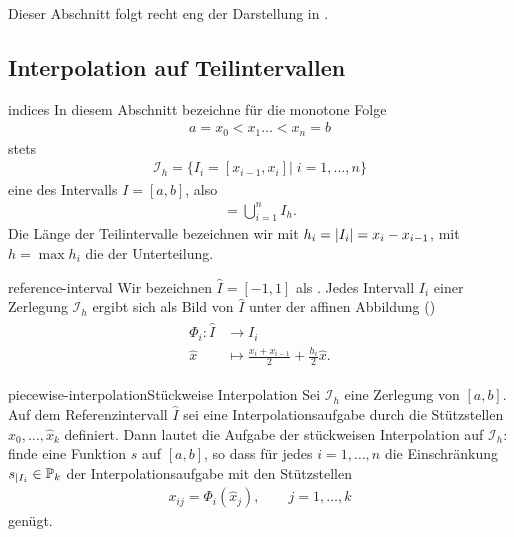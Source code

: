 Dieser Abschnitt folgt recht eng der Darstellung in \cite[Abschnitt 2.3]{Rannacher17}.

\subsection{Interpolation auf Teilintervallen}

\begin{Notation}{indices}
  In diesem Abschnitt bezeichne für die monotone Folge
  \begin{gather}
    a = x_0 < x_1 \dots < x_n = b
  \end{gather}
  stets
  \begin{gather}
    \mathcal I_h = \bigl\{ I_i = [x_{i-1},x_i] \big|
    \; i=1,\dots,n\bigr\}
  \end{gather}
  eine  des Intervalls $I=[a,b]$, also
  \begin{gather}
    [a,b] = \bigcup_{i=1}^n I_h.
  \end{gather}
  Die Länge der Teilintervalle bezeichnen wir mit
  $h_i = \abs{I_i} = x_{i} - x_{i-1}$, mit $h=\max h_i$ die
   der Unterteilung.
\end{Notation}

\begin{Definition}{reference-interval}
  Wir bezeichnen $\hat I = [-1,1]$ als . Jedes
  Intervall $I_i$ einer Zerlegung $\mathcal I_h$ ergibt sich als Bild
  von $\hat I$ unter der affinen Abbildung ()
  \begin{gather}
    \begin{split}
      \Phi_i\colon \hat I &\to I_i\\
      \hat x &\mapsto \tfrac{x_{i}+x_{i-1}}{2} + \tfrac{h_i}{2} \hat x.
    \end{split}
  \end{gather}
\end{Definition}

\begin{Definition*}{piecewise-interpolation}{Stückweise Interpolation}
  Sei $\mathcal I_h$ eine Zerlegung von $[a,b]$. Auf dem
  Referenzintervall $\hat I$ sei eine Interpolationsaufgabe durch die
  Stützstellen $\hat x_0,\dots, \hat x_k$ definiert. Dann lautet die
  Aufgabe der stückweisen Interpolation auf $\mathcal I_h$: finde eine
  Funktion $s$ auf $[a,b]$, so dass für jedes $i=1,\dots,n$ die
  Einschränkung $s_{|I_i} \in \P_k$ der Interpolationsaufgabe mit den
  Stützstellen
  \begin{gather}
    x_{ij} = \Phi_i(\hat x_j),\qquad j=1,\dots,k
  \end{gather}
  genügt.
\end{Definition*}

